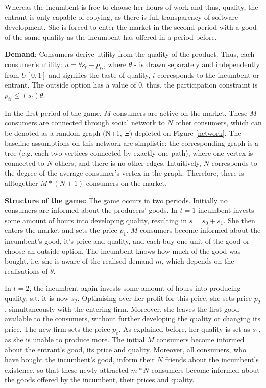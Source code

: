 \documentclass{article}
\numberwithin{figure}{section}
\numberwithin{table}{section}
\theoremstyle{indented}
\numberwithin{equation}{section} %
\begin{document}
Whereas the incumbent is free to choose her hours of work and thus, quality, the entrant is only capable of copying, as there is full transparency of software development.  She is forced to enter the market in the second period with a good of the same quality as the incumbent has offered in a period before.

\textbf{Demand}: 
Consumers derive utility from the quality of the product. Thus, each consumer's utility: $u = \theta s_t - p_{ti}$, where $\theta$ - is drawn separately and independently from $U[0,1]$ and signifies the taste of quality, $i$ corresponds to the incumbent or entrant. The outside option has a value of 0, thus, the participation constraint is $p_{ti}\leq (s_t) \theta$. 


In the first period of the game, $M$ consumers are active on the market. These $M$ consumers are connected through social network to $N$ other consumers, which can be denoted as a random graph (N+1, $\Xi$) depicted on Figure \ref{network}. The baseline assumptions on this network are simplistic: the corresponding graph is a tree (e.g. each two vertices connected by exactly one path), where one vertex is connected to $N$ others, and there is no other edges. Intuitively, $N$ corresponds to the degree of the average consumer's vertex in the graph. Therefore, there is alltogether $M*(N+1)$ consumers on the market.

\textbf{Structure of the game:}
The game occurs in two periods. Initially no consumers are informed about the producers' goods. In \textbf{$t=1$} incumbent invests some amount of hours into developing quality, resulting in $s = s_0+s_1$. She then enters the market and sets the price $p_1$. $M$ consumers become informed about the incumbent's good, it's price and quality, and each buy one unit of the good or choose an outside option. The incumbent knows how much of the good was bought, i.e. she is aware of the realised demand $m$, which depends on the realisations of $\theta$. 

In \textbf{$t=2$}, the incumbent again invests some amount of hours into producing quality, s.t. it is now  $s_2$. Optimising over her profit for this price, she sets price $p_2$, simultaneously with the entering firm. Moreover, she leaves the first good available to the consumers, without further developing the quality or changing its price. The new firm sets the price $p_e$. As explained before, her quality is set as $s_1$, as she is unable to produce more. The initial $M$ consumers become informed about the entrant's good, its price and quality. Moreover, all consumers, who have bought the incumbent's good, inform their $N$ friends about the incumbent's existence, so that these newly attracted $m*N$ consumers become informed about the goods offered by the incumbent, their prices and quality.
\end{document}

